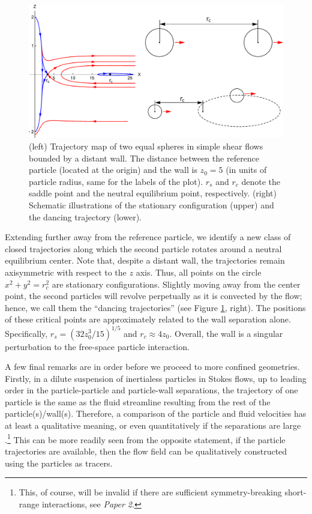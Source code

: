 \begin{figure}%
  \centering
  \includegraphics[width=\columnwidth]{itzhak-boris.pdf}
  \caption{
  (left) Trajectory map of two equal spheres in simple shear flows bounded by a distant wall. The distance between the reference particle (located at the origin) and the wall is $z_0=5$ (in units of particle radius, same for the labels of the plot). $r_s$ and $r_c$ denote the saddle point and the neutral equilibrium point, respectively.
  (right) Schematic illustrations of the stationary configuration (upper) and the dancing trajectory (lower).}
  \label{fig:itzhak-boris}
\end{figure}

Extending further away from the reference particle, we identify a new class of closed trajectories along which the second particle rotates around a neutral equilibrium center. Note that, despite a distant wall, the trajectories remain axisymmetric with respect to the $z$ axis. Thus, all points on the circle $x^2+y^2=r_c^2$ are stationary configurations.
Slightly moving away from the center point, the second particles will revolve perpetually as it is convected by the flow; hence, we call them the ``dancing trajectories'' (see Figure \ref{fig:itzhak-boris}, right).
The positions of these critical points are approximately related to the wall separation alone. Specifically, $r_s=(32z_0^3/15)^{1/5}$ and $r_c \approx 4z_0$.
Overall, the wall is a singular perturbation to the free-space particle interaction.

\medskip
A few final remarks are in order before we proceed to more confined geometries.
Firstly, in a dilute suspension of inertialess particles in Stokes flows, up to leading order in the particle-particle and particle-wall separations, the trajectory of one particle is the same as the fluid streamline resulting from the rest of the particle(s)/wall(s). Therefore, a comparison of the particle and fluid velocities has at least a qualitative meaning, or even quantitatively if the separations are large \citep{zurita-gotor_2007}.\footnote{This, of course, will be invalid if there are sufficient symmetry-breaking short-range interactions, see \eg \emph{Paper 2}.}
This can be more readily seen from the opposite statement, \ie if the particle trajectories are available, then the flow field can be qualitatively constructed using the particles as tracers.

